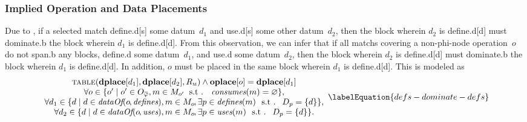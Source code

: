 \subsubsection{Implied Operation and Data Placements}

Due to , if a selected \gls{match}
\gls{define.d}[s] some \gls{datum}~$d_1$ and \gls{use.d}[s] some other
\gls{datum}~$d_2$, then the \gls{block} wherein $d_2$ is \gls{define.d}[d] must
\gls{dominate.b} the \gls{block} wherein $d_1$ is \gls{define.d}[d].
%
From this observation, we can infer that if all \glspl{match} covering a
non-\gls{phi-node} \gls{operation}~$o$ do not \gls{span.b} any \glspl{block},
\gls{define.d} some \gls{datum}~$d_1$, and \gls{use.d} some \gls{datum}~$d_2$,
then the \gls{block} wherein $d_2$ is \gls{define.d}[d] must \gls{dominate.b}
the \gls{block} wherein $d_1$ is \gls{define.d}[d].
%
In addition, $o$ must be placed in the same \gls{block} wherein $d_1$ is
\gls{define.d}[d].
%
This is modeled as
%
\begin{equation}
  \begin{array}{c}
    \mTable(\mVar{dplace}[d_1], \mVar{dplace}[d_2], \mDomMatrix)
    \mAnd
    \mVar{oplace}[o] = \mVar{dplace}[d_1] \\
    \forall o \in
      \mSetBuilder{o'}%
                  {%
                    o' \in \mOpCompSet{\mPhi},
                    m \in \mMatchSet[o'] \hspace{-1pt}
                    \text{ \st }
                    \mConsumes(m) = \mEmptySet
                  }, \\
    \forall d_1 \in
      \mSetBuilder{d}%
                  {%
                    d \in \mDataOf(o \hspace{-1pt}, \mDefines),
                    m \in \mMatchSet[o] \hspace{-1pt},
                    \exists p \in \mDefines(m)
                    \text{ \st }
                    \mDataSet[p] = \mSet{d}
                  }, \\
    \forall d_2 \in
      \mSetBuilder{d}%
                  {%
                    d \in \mDataOf(o \hspace{-1pt}, \mUses),
                    m \in \mMatchSet[o] \hspace{-1pt},
                    \exists p \in \mUses(m)
                    \text{ \st }
                    \mDataSet[p] = \mSet{d}
                  }.
  \end{array}
  \labelEquation{defs-dominate-defs}
\end{equation}
